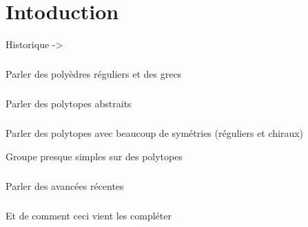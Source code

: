\chapter*{Intoduction}

Historique ->



\paragraph{}
Parler des polyèdres réguliers et des grecs

\paragraph{}
Parler des polytopes abstraits

\paragraph{}
Parler des polytopes avec beaucoup de symétries (réguliers et chiraux)

Groupe presque simples sur des polytopes

\paragraph{}
Parler des avancées récentes

\paragraph{}
Et de comment ceci vient les compléter
